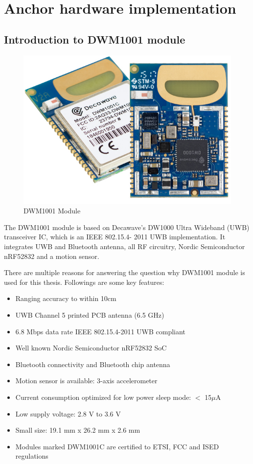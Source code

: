 \documentclass[\main/main.tex]{subfiles}
\begin{document}
\graphicspath{{img/}{04_hardware/img/}}

\chapter{Anchor hardware implementation}

\section{Introduction to DWM1001 module}
\begin{figure}[H]
    \begin{center}
        \includegraphics[scale=0.35]{DWM1001-Module_ProdPage_600x430.jpg}
    \end{center}
    \caption{DWM1001 Module}
    \label{fig:dwm1001c_module}
\end{figure}

The DWM1001 module is based on Decawave's DW1000 Ultra
Wideband (UWB) transceiver IC, which is an IEEE 802.15.4-
2011 UWB implementation. It integrates UWB and Bluetooth
antenna, all RF circuitry, Nordic Semiconductor nRF52832 and
a motion sensor.

There are multiple reasons for answering the question why DWM1001 module is used for this thesis.
Followings are some key features:
\begin{itemize}
    \item Ranging accuracy to within 10cm
    \item UWB Channel 5 printed PCB antenna (6.5 GHz)
    \item 6.8 Mbps data rate IEEE 802.15.4-2011 UWB compliant
    \item Well known Nordic Semiconductor nRF52832 SoC
    \item Bluetooth connectivity and Bluetooth chip antenna
    \item Motion sensor is available: 3-axis accelerometer
    \item Current consumption optimized for low power sleep mode: $<$ 15$\mu$A
    \item Low supply voltage: 2.8 V to 3.6 V
    \item Small size: 19.1 mm x 26.2 mm x 2.6 mm
    \item Modules marked DWM1001C are certified to ETSI, FCC and ISED regulations
\end{itemize}
\end{document}
